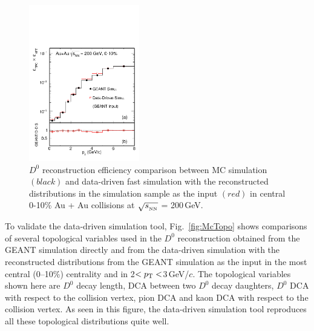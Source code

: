 \documentclass[%
 reprint,	
 amsmath,amssymb,
 aps,
 prc,
]{revtex4-1}
\begin{document}
\begin{figure}
\centering
\includegraphics[width=0.43\textwidth]{fig/Mcd0Eff_0_10.pdf}
\caption{$D^{0}$ reconstruction efficiency comparison between MC simulation $(black)$ and data-driven fast simulation with the reconstructed distributions in the simulation sample as the input $(red)$ in central 0-10\% Au + Au collisions at $\sqrt{s_{_{\rm NN}}}$ = 200\,GeV.}
\label{fig:Mcd0Eff_0_10} 
\end{figure}



To validate the data-driven simulation tool, Fig.~\ref{fig:McTopo} shows comparisons of several topological variables used in the $D^0$ reconstruction obtained from the GEANT simulation directly and from the data-driven simulation with the reconstructed distributions from the GEANT simulation as the input in the most central (0--10\%) centrality and in 2$<p_{\rm T}<$3\,GeV/$c$. The topological variables shown here are $D^0$ decay length, DCA between two $D^0$ decay daughters, $D^0$ DCA with respect to the collision vertex, pion DCA and kaon DCA with respect to the collision vertex. As seen in this figure, the data-driven simulation tool reproduces all these topological distributions quite well.
\end{document}
